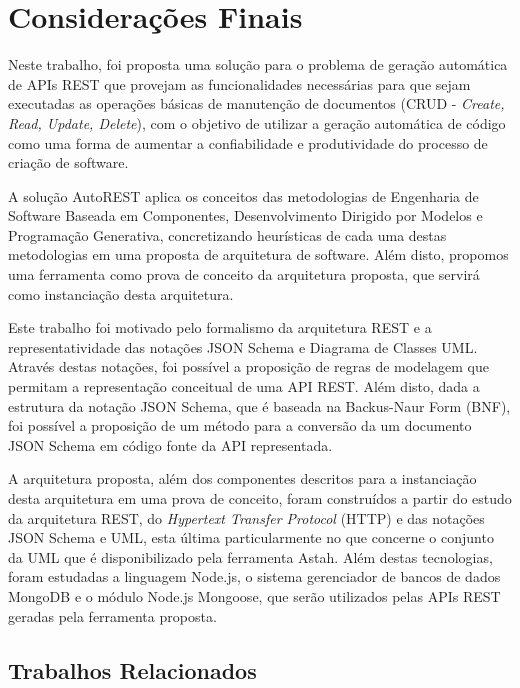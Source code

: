 \chapter{Considerações Finais}
\label{chap:concl}

Neste trabalho, foi proposta uma solução para o problema de geração automática de APIs REST que provejam as funcionalidades necessárias para que sejam executadas as operações básicas de manutenção de documentos (CRUD - \textit{Create, Read, Update, Delete}), com o objetivo de utilizar a geração automática de código como uma forma de aumentar a confiabilidade e produtividade do processo de criação de software.

A solução AutoREST aplica os conceitos das metodologias de Engenharia de Software Baseada em Componentes, Desenvolvimento Dirigido por Modelos e Programação Generativa, concretizando heurísticas de cada uma destas metodologias em uma proposta de arquitetura de software. Além disto, propomos uma ferramenta como prova de conceito da arquitetura proposta, que servirá como instanciação desta arquitetura.

Este trabalho foi motivado pelo formalismo da arquitetura REST e a representatividade das notações JSON Schema e Diagrama de Classes UML. Através destas notações, foi possível a proposição de regras de modelagem que permitam a representação conceitual de uma API REST. Além disto, dada a estrutura da notação JSON Schema, que é baseada na Backus-Naur Form (BNF), foi possível a proposição de um método para a conversão da um documento JSON Schema em código fonte da API representada.

A arquitetura proposta, além dos componentes descritos para a instanciação desta arquitetura em uma prova de conceito, foram construídos a partir do estudo da arquitetura REST, do \textit{Hypertext Transfer Protocol} (HTTP) e das notações JSON Schema e UML, esta última particularmente no que concerne o conjunto da UML que é disponibilizado pela ferramenta Astah. Além destas tecnologias, foram estudadas a linguagem Node.js, o sistema gerenciador de bancos de dados MongoDB e o módulo Node.js Mongoose, que serão utilizados pelas APIs REST geradas pela ferramenta proposta.


\section{Trabalhos Relacionados}
\label{sec:related}

